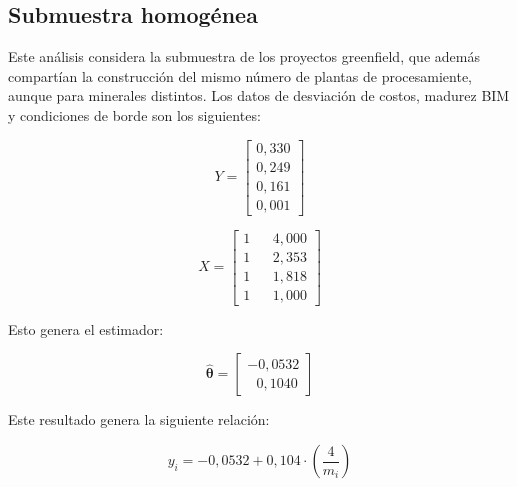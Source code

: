 \subsection{Submuestra homogénea}

Este análisis considera la submuestra de los proyectos greenfield, que además compartían la construcción del mismo número de plantas de procesamiente, aunque para minerales distintos. Los datos de desviación de costos, madurez BIM y condiciones de borde son los siguientes:

\begin{minipage}{.45\linewidth}
    \begin{equation*}
    Y = 
        \begin{bmatrix}
            0,330 \\
            0,249 \\
            0,161 \\
            0,001 
        \end{bmatrix}
    \end{equation*}
\end{minipage}
\begin{minipage}{.45\linewidth}
    \begin{equation*}
    X = 
        \begin{bmatrix}
            1 & & 4,000 \\
            1 & & 2,353 \\
            1 & & 1,818 \\
            1 & & 1,000
        \end{bmatrix}
    \end{equation*}
\end{minipage}

Esto genera el estimador:

\begin{equation}
    \hat{\bm{\theta}} = 
        \begin{bmatrix}
            -0,0532 \\
            ~~~0,1040
        \end{bmatrix}
\end{equation}

Este resultado genera la siguiente relación:

\begin{equation}
    \label{eq.modelo-prop-submuestra}
    y_i = -0,0532 + 0,104\cdot \left( \frac{4}{m_i} \right)
\end{equation}

